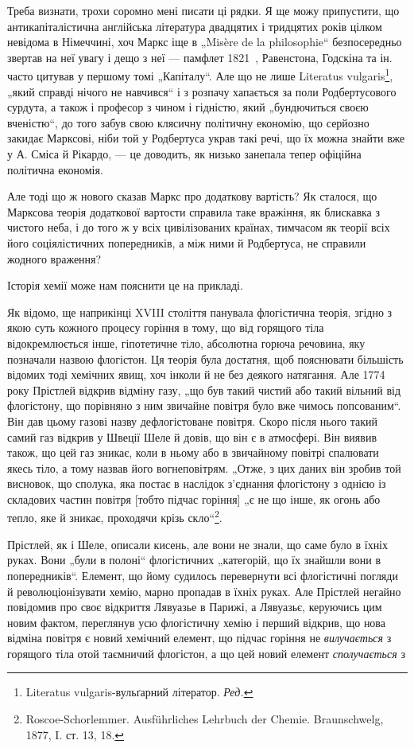 
Треба визнати, трохи соромно мені писати ці рядки. Я ще можу
припустити, що антикапіталістична англійська література двадцятих і
тридцятих років цілком невідома в Німеччині, хоч Маркс іще в „Misère
de la philosophie“ безпосередньо звертав на неї увагу і дещо з неї —
памфлет 1821~, Равенстона, Годскіна та ін. часто цитував у першому
томі „Капіталу“. Але що не лише Literatus vulgaris\footnote*{
Literatus vulgaris-вульґарний літератор. \emph{Ред.}
}, „який справді
нічого не навчився“ і з розпачу хапається за поли Родбертусового сурдута,
а також і професор з чином і гідністю, який „бундючиться
своєю вченістю“, до того забув свою клясичну політичну економію, що
серйозно закидає Марксові, ніби той у Родбертуса украв такі речі, що
їх можна знайти вже у А. Сміса й Рікардо, — це доводить, як низько
занепала тепер офіційна політична економія.

Але тоді що ж нового сказав Маркс про додаткову вартість? Як
сталося, що Марксова теорія додаткової вартости справила таке вражіння,
як блискавка з чистого неба, і до того ж у всіх цивілізованих країнах,
тимчасом як теорії всіх його соціялістичних попередників, а між ними й
Родбертуса, не справили жодного враження?

Історія хемії може нам пояснити це на прикладі.

Як відомо, ще наприкінці XVIII століття панувала флогістична теорія,
згідно з якою суть кожного процесу горіння в тому, що від горящого
тіла відокремлюється інше, гіпотетичне тіло, абсолютна горюча речовина,
яку позначали назвою флогістон. Ця теорія була достатня, щоб пояснювати
більшість відомих тоді хемічних явищ, хоч інколи й не без деякого
натягання. Але 1774 року Прістлей відкрив відміну газу, „що був такий
чистий або такий вільний від флогістону, що порівняно з ним звичайне
повітря було вже чимось попсованим“. Він дав цьому газові назву дефлогістоване
повітря. Скоро після нього такий самий газ відкрив у Швеції
Шеле й довів, що він є в атмосфері. Він виявив також, що цей газ
зникає, коли в ньому або в звичайному повітрі спалювати якесь тіло, а
тому назвав його вогнеповітрям. „Отже, з цих даних він зробив той
висновок, що сполука, яка постає в наслідок з’єднання флогістону з
однією із складових частин повітря [тобто підчас горіння] „є не що
інше, як огонь або тепло, яке й зникає, проходячи крізь скло“\footnote{
Roscoe-Schorlemmer. Ausführliches Lehrbuch der Chemie. Braunschwelg, 1877,
I. ст. 13, 18.
}.

Прістлей, як і Шеле, описали кисень, але вони не знали, що саме
було в їхніх руках. Вони „були в полоні“ флогістичних „категорій, що
їх знайшли вони в попередників“. Елемент, що йому судилось перевернути
всі флогістичні погляди й революціонізувати хемію, марно пропадав
в їхніх руках. Але Прістлей негайно повідомив про своє відкриття
Лявуазье в Парижі, а Лявуазьє, керуючись цим новим фактом, переглянув
усю флогістичну хемію і перший відкрив, що нова відміна повітря
є новий хемічний елемент, що підчас горіння не \emph{вилучається} з горящого
тіла отой таємничий флогістон, а що цей новий елемент \emph{сполучається} з
\parbreak{}  %
